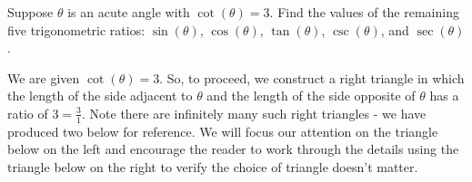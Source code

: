 \documentclass{ximera}
\begin{document}
\begin{example} \label{righttriangleex2}  Suppose $\theta$ is an acute angle with $\cot(\theta) = 3$.  Find the values of the remaining five trigonometric ratios:  $\sin(\theta)$, $\cos(\theta)$, $\tan(\theta)$, $\csc(\theta)$, and $\sec(\theta)$.

\begin{explanation}  We are given $\cot(\theta) = 3 $.  So, to proceed, we construct a right triangle in which the length of the side adjacent to $\theta$ and the length of the side opposite of $\theta$ has a ratio of $3 = \frac{3}{1}$.  Note there are infinitely many such right triangles - we have produced two below for reference.  We will focus our attention on the triangle below on the left and encourage the reader to work through the details using the triangle below on the right to verify the choice of triangle doesn't matter.

\begin{image}
\end{image}
\end{explanation}
\end{example}
\end{document}
